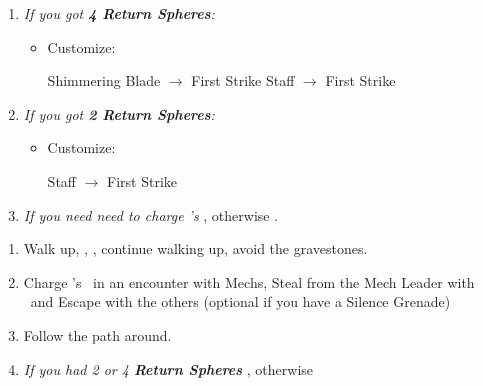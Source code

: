 \begin{enumerate}[resume]
    \item \textit{If you got \textbf{4 Return Spheres}:}
    \begin{itemize}
        \item Customize:
        \begin{itemize}
            \auronf Shimmering Blade $\rightarrow$ First Strike
            \yunaf Staff $\rightarrow$ First Strike
        \end{itemize}
    \end{itemize}
    \item \textit{If you got \textbf{2 Return Spheres}:}
    \begin{itemize}
        \item Customize:
        \begin{itemize}
            \yunaf Staff $\rightarrow$ First Strike
        \end{itemize}
    \end{itemize}
    \bothvfill
    \winvfill
    \lossvfill
    \item \textit{If you need need to charge \rikku's \od} \formation{\tidus}{\rikku}{\auron}, otherwise \formation{\tidus}{\kimahri}{\wakka}.
\end{enumerate}
\begin{enumerate}[resume]
    \item Walk up, \sd, \cs[1:20], continue walking up, avoid the gravestones.
    \item Charge \rikku's \od\ in an encounter with Mechs, Steal from the Mech Leader with \rikku\ and Escape with the others (optional if you have a Silence Grenade)
    \item Follow the path around.
    \item \textit{If you had 2 or 4 \textbf{Return Spheres}} \formation{\tidus}{\yuna}{\auron}, otherwise \formation{\tidus}{\kimahri}{\wakka}
\end{enumerate}

